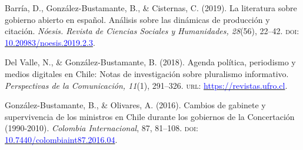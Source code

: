 \begin{publications}
\begin{benumerate}{10}
\item{Barría, D., González-Bustamante, B., \& Cisternas, C. (2019). La literatura sobre gobierno abierto en español. Análisis sobre las dinámicas de producción y citación. {\itshape Nóesis. Revista de Ciencias Sociales y Humanidades, 28}(56), 22--42. {\scshape doi}: \href{http://dx.doi.org/10.20983/noesis.2019.2.3}{\textcolor{blue}{10.20983/noesis.2019.2.3}}.}\vspace{1mm}


\item{Del Valle, N., \& González-Bustamante, B. (2018). Agenda política, periodismo y medios digitales en Chile: Notas de investigación sobre pluralismo informativo. {\itshape Perspectivas de la Comunicación, 11}(1), 291--326. {\scshape url:} \href{https://revistas.ufro.cl/ojs/index.php/perspectivas/article/view/1146}{\textcolor{blue}{https://revistas.ufro.cl}}.}\vspace{1mm}


\item{González-Bustamante, B., \& Olivares, A. (2016). Cambios de gabinete y supervivencia de los ministros en Chile durante los gobiernos de la Concertación (1990-2010). {\itshape Colombia Internacional}, 87, 81--108. {\scshape doi}: \\ \href{https://doi.org/10.7440/colombiaint87.2016.04}{\textcolor{blue}{10.7440/colombiaint87.2016.04}}.}\vspace{1mm}



\end{benumerate}
\end{publications}
